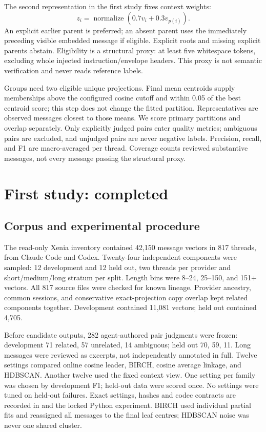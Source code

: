 \documentclass[11pt]{article}
\begin{document}
The second representation in the first study fixes context weights:
\[
 z_i=\operatorname{normalize}(0.7v_i+0.3v_{p(i)}).
\]
An explicit earlier parent is preferred; an absent parent uses the immediately
preceding visible embedded message if eligible. Explicit roots and missing
explicit parents abstain. Eligibility is a structural proxy: at least five
whitespace tokens, excluding whole injected instruction/envelope headers.
This proxy is not semantic verification and never reads reference labels.

Groups need two eligible unique projections. Final mean centroids supply
memberships above the configured cosine cutoff and within 0.05 of the best
centroid score; this step does not change the fitted partition. Representatives
are observed messages closest to those means. We score primary partitions and
overlap separately. Only explicitly judged pairs enter quality metrics;
ambiguous pairs are excluded, and unjudged pairs are never negative labels.
Precision, recall, and F1 are macro-averaged per thread. Coverage counts reviewed
substantive messages, not every message passing the structural proxy.

\section{First study: completed}
\subsection{Corpus and experimental procedure}
The read-only Xenia inventory contained 42,150 message vectors in 817 threads,
from Claude Code and Codex. Twenty-four independent components were sampled:
12 development and 12 held out, two threads per provider and short/medium/long
stratum per split. Length bins were 8--24, 25--150, and 151+ vectors. All 817
source files were checked for known lineage. Provider ancestry, common sessions,
and conservative exact-projection copy overlap kept related components together.
Development contained 11,081 vectors; held out contained 4,705.

Before candidate outputs, 282 agent-authored pair judgments were frozen:
development 71 related, 57 unrelated, 14 ambiguous; held out 70, 59, 11.
Long messages were reviewed as excerpts, not independently annotated in full.
Twelve settings compared online cosine leader, BIRCH, cosine average linkage,
and HDBSCAN. Another twelve used the fixed context view. One setting per family
was chosen by development F1; held-out data were scored once. No settings were
tuned on held-out failures. Exact settings, hashes and codec contracts are
recorded in  and the locked Python
experiment. BIRCH used individual partial fits and reassigned all messages to
the final leaf centres; HDBSCAN noise was never one shared cluster.
\end{document}
